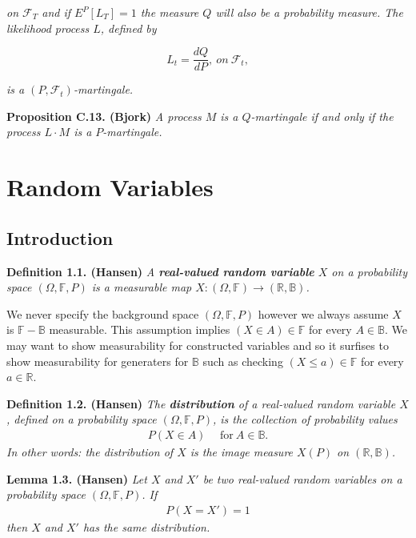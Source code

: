 \documentclass[a4paper,12pt,openany]{book}
\begin{document}
\emph{on \(\mathcal{F}_T\) and if \(E^P[L_T]=1\) the measure \(Q\) will also be a probability measure. The likelihood process \(L\), defined by}

\[
L_t=\frac{dQ}{dP},\ on\ \mathcal{F}_t,\tag{C.8}
\]

\emph{is a \((P,\mathcal{F}_t)\)-martingale.}

\textbf{Proposition C.13. (Bjork)} \emph{A process \(M\) is a \(Q\)-martingale if and only if the process \(L\cdot M\) is a \(P\)-martingale.}

\hypertarget{random-variables-1}{%
\chapter{Random Variables}\label{random-variables-1}}

\hypertarget{introduction-1}{%
\section{Introduction}\label{introduction-1}}

\textbf{Definition 1.1. (Hansen)} \emph{A \textbf{real-valued random variable} \(X\) on a probability space \((\Omega, \mathbb{F},P)\) is a measurable map \(X : (\Omega,\mathbb{F})\to (\mathbb{R},\mathbb{B})\).}

We never specify the background space \((\Omega, \mathbb{F},P)\) however we always assume \(X\) is \(\mathbb{F}-\mathbb{B}\) measurable. This assumption implies \((X\in A)\in \mathbb{F}\) for every \(A\in \mathbb{B}\). We may want to show measurability for constructed variables and so it surfises to show measurability for generaters for \(\mathbb{B}\) such as checking \((X\le a)\in\mathbb{F}\) for every \(a\in\mathbb{R}\).

\textbf{Definition 1.2. (Hansen)} \emph{The \textbf{distribution} of a real-valued random variable \(X\), defined on a probability space \((\Omega,\mathbb{F},P)\), is the collection of probability values}
\begin{align*}
    P(X\in A)\hspace{15pt}\text{for}\ A\in \mathbb{B}.\tag{1.3}
\end{align*}
\emph{In other words: the distribution of \(X\) is the image measure \(X(P)\) on \((\mathbb{R},\mathbb{B})\).}

\textbf{Lemma 1.3. (Hansen)} \emph{Let \(X\) and \(X'\) be two real-valued random variables on a probability space \((\Omega,\mathbb{F},P)\). If}
\begin{align*}
    P(X=X')=1
\end{align*}
\emph{then \(X\) and \(X'\) has the same distribution.}
\end{document}
